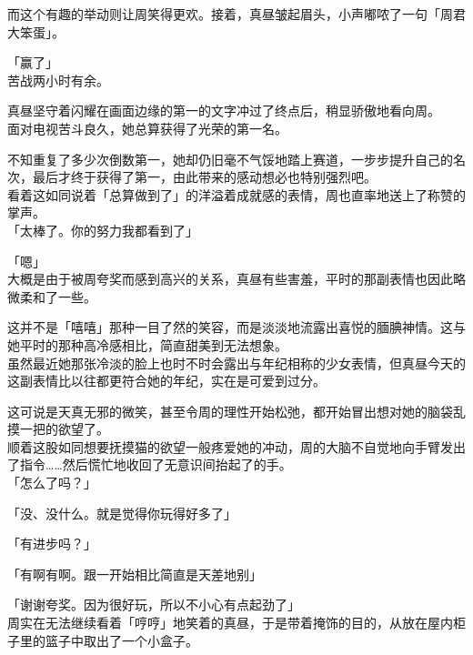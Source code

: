 而这个有趣的举动则让周笑得更欢。接着，真昼皱起眉头，小声嘟哝了一句「周君大笨蛋」。\\

\vspace{2\baselineskip}

「赢了」\\

苦战两小时有余。

真昼坚守着闪耀在画面边缘的第一的文字冲过了终点后，稍显骄傲地看向周。\\

面对电视苦斗良久，她总算获得了光荣的第一名。

不知重复了多少次倒数第一，她却仍旧毫不气馁地踏上赛道，一步步提升自己的名次，最后才终于获得了第一，由此带来的感动想必也特别强烈吧。\\

看着这如同说着「总算做到了」的洋溢着成就感的表情，周也直率地送上了称赞的掌声。\\

「太棒了。你的努力我都看到了」

「嗯」\\

大概是由于被周夸奖而感到高兴的关系，真昼有些害羞，平时的那副表情也因此略微柔和了一些。

这并不是「嘻嘻」那种一目了然的笑容，而是淡淡地流露出喜悦的腼腆神情。这与她平时的那种高冷感相比，简直甜美到无法想象。\\

虽然最近她那张冷淡的脸上也时不时会露出与年纪相称的少女表情，但真昼今天的这副表情比以往都更符合她的年纪，实在是可爱到过分。

这可说是天真无邪的微笑，甚至令周的理性开始松弛，都开始冒出想对她的脑袋乱摸一把的欲望了。\\

顺着这股如同想要抚摸猫的欲望一般疼爱她的冲动，周的大脑不自觉地向手臂发出了指令……然后慌忙地收回了无意识间抬起了的手。\\

「怎么了吗？」

「没、没什么。就是觉得你玩得好多了」

「有进步吗？」

「有啊有啊。跟一开始相比简直是天差地别」

「谢谢夸奖。因为很好玩，所以不小心有点起劲了」\\

周实在无法继续看着「哼哼」地笑着的真昼，于是带着掩饰的目的，从放在屋内柜子里的篮子中取出了一个小盒子。\\

